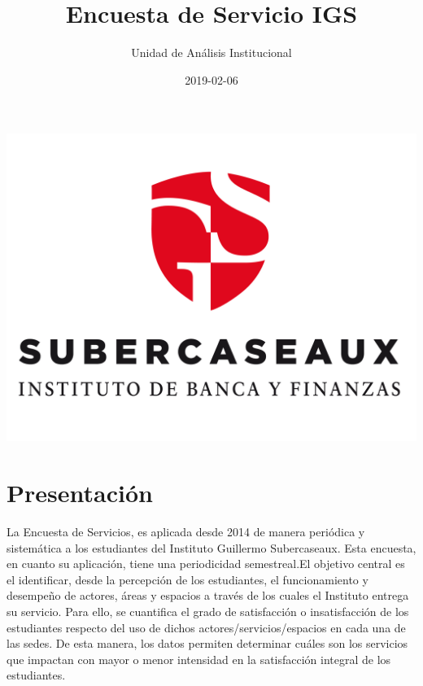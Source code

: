 \documentclass[]{book}
\title{Encuesta de Servicio IGS}
\author{Unidad de Análisis Institucional}
\date{2019-02-06}
\theoremstyle{definition}
\theoremstyle{definition}
\theoremstyle{definition}
\theoremstyle{remark}
\begin{document}
\maketitle

{
\setcounter{tocdepth}{1}
\tableofcontents
}
\chapter*{}\label{section}

\begin{center}\includegraphics{images/logoieb} \end{center}

\chapter*{Presentación}\label{presentacion}

La Encuesta de Servicios, es aplicada desde 2014 de manera periódica y
sistemática a los estudiantes del Instituto Guillermo Subercaseaux. Esta
encuesta, en cuanto su aplicación, tiene una periodicidad semestreal.El
objetivo central es el identificar, desde la percepción de los
estudiantes, el funcionamiento y desempeño de actores, áreas y espacios
a través de los cuales el Instituto entrega su servicio. Para ello, se
cuantifica el grado de satisfacción o insatisfacción de los estudiantes
respecto del uso de dichos actores/servicios/espacios en cada una de las
sedes. De esta manera, los datos permiten determinar cuáles son los
servicios que impactan con mayor o menor intensidad en la satisfacción
integral de los estudiantes.
\end{document}
